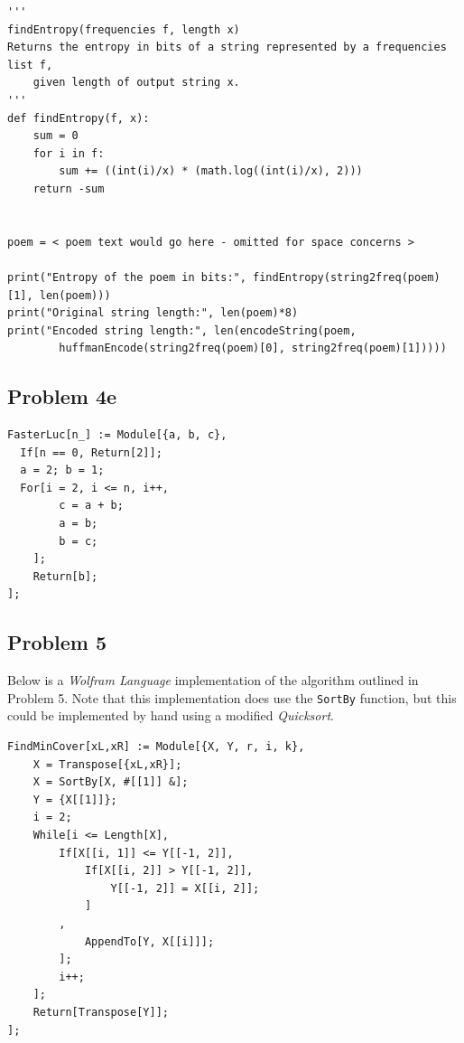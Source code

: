 \documentclass[12pt]{article}
\begin{document}
\begin{small}
\begin{verbatim}
'''
findEntropy(frequencies f, length x)
Returns the entropy in bits of a string represented by a frequencies list f,
    given length of output string x.
'''
def findEntropy(f, x):
    sum = 0
    for i in f:
        sum += ((int(i)/x) * (math.log((int(i)/x), 2)))
    return -sum


poem = < poem text would go here - omitted for space concerns > 

print("Entropy of the poem in bits:", findEntropy(string2freq(poem)[1], len(poem)))
print("Original string length:", len(poem)*8)
print("Encoded string length:", len(encodeString(poem, 
        huffmanEncode(string2freq(poem)[0], string2freq(poem)[1]))))
\end{verbatim}
\end{small}

\subsection*{Problem 4e}
\begin{small}
\begin{verbatim}
FasterLuc[n_] := Module[{a, b, c},
  If[n == 0, Return[2]];
  a = 2; b = 1;
  For[i = 2, i <= n, i++,
        c = a + b;
        a = b;
        b = c;
    ];
    Return[b];
];
\end{verbatim}
\end{small}

\subsection*{Problem 5}

Below is a \textit{Wolfram Language} implementation of the algorithm outlined in Problem 5. Note that this implementation does use the {\tt SortBy} function, but this could be implemented by hand using a modified 
\textit{Quicksort}.
\begin{small}
\begin{verbatim}
FindMinCover[xL,xR] := Module[{X, Y, r, i, k},
    X = Transpose[{xL,xR}];
    X = SortBy[X, #[[1]] &];
    Y = {X[[1]]};
    i = 2;
    While[i <= Length[X],
        If[X[[i, 1]] <= Y[[-1, 2]],
            If[X[[i, 2]] > Y[[-1, 2]],
                Y[[-1, 2]] = X[[i, 2]];
            ]
        ,
            AppendTo[Y, X[[i]]];
        ];
        i++;
    ];
    Return[Transpose[Y]];
];
\end{verbatim}
\end{small}
\end{document}
